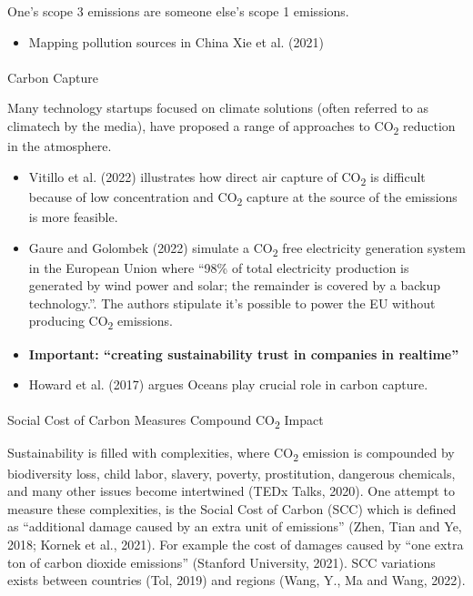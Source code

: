 \documentclass[
  letterpaper,
  DIV=11,
  numbers=noendperiod]{scrartcl}
\makeatletter
\let\oldparagraph\paragraph
\renewcommand{\paragraph}{
    \@ifstar
      \xxxParagraphStar
      \xxxParagraphNoStar
  }
\newcommand{\xxxParagraphStar}[1]{\oldparagraph*{#1}\mbox{}}
\newcommand{\xxxParagraphNoStar}[1]{\oldparagraph{#1}\mbox{}}
\providecommand{\tightlist}{%
  \setlength{\itemsep}{0pt}\setlength{\parskip}{0pt}}\usepackage{longtable,booktabs,array}
\makeatother
\begin{document}
One's scope 3 emissions are someone else's scope 1 emissions.

\begin{itemize}
\tightlist
\item
  Mapping pollution sources in China Xie et al. (2021)
\end{itemize}

\paragraph{Carbon Capture}\label{carbon-capture}

Many technology startups focused on climate solutions (often referred to
as climatech by the media), have proposed a range of approaches to
CO\textsubscript{2} reduction in the atmosphere.

\begin{itemize}
\item
  Vitillo et al. (2022) illustrates how direct air capture of
  CO\textsubscript{2} is difficult because of low concentration and
  CO\textsubscript{2} capture at the source of the emissions is more
  feasible.
\item
  Gaure and Golombek (2022) simulate a CO\textsubscript{2} free
  electricity generation system in the European Union where ``98\% of
  total electricity production is generated by wind power and solar; the
  remainder is covered by a backup technology.''. The authors stipulate
  it's possible to power the EU without producing CO\textsubscript{2}
  emissions.
\item
  \textbf{Important: ``creating sustainability trust in companies in
  realtime''}
\item
  Howard et al. (2017) argues Oceans play crucial role in carbon
  capture.
\end{itemize}

\paragraph{\texorpdfstring{Social Cost of Carbon Measures Compound
CO\textsubscript{2}
Impact}{Social Cost of Carbon Measures Compound CO2 Impact}}\label{social-cost-of-carbon-measures-compound-co2-impact}

Sustainability is filled with complexities, where CO\textsubscript{2}
emission is compounded by biodiversity loss, child labor, slavery,
poverty, prostitution, dangerous chemicals, and many other issues become
intertwined (TEDx Talks, 2020). One attempt to measure these
complexities, is the Social Cost of Carbon (SCC) which is defined as
``additional damage caused by an extra unit of emissions'' (Zhen, Tian
and Ye, 2018; Kornek et al., 2021). For example the cost of damages
caused by ``one extra ton of carbon dioxide emissions'' (Stanford
University, 2021). SCC variations exists between countries (Tol, 2019)
and regions (Wang, Y., Ma and Wang, 2022).
\end{document}
